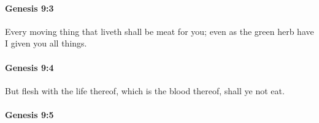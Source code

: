 
		\paragraph{Genesis 9:3} %
			\label{GENESIS-9-3}

			Every moving thing that liveth shall be meat for you; even as the green herb have I given you all things.


		\paragraph{Genesis 9:4} %
			\label{GENESIS-9-4}

			But flesh with the life thereof, which is the blood thereof, shall ye not eat.


		\paragraph{Genesis 9:5} %
			\label{GENESIS-9-5}


